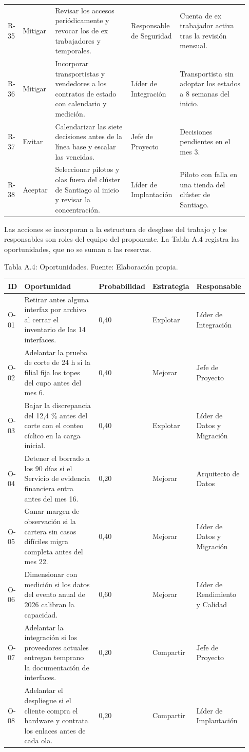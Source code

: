 \documentclass[11pt]{article}
\begin{document}
\begin{longtable}{p{0.065\linewidth}p{0.102\linewidth}p{0.316\linewidth}p{0.158\linewidth}p{0.288\linewidth}}
R-35 & Mitigar & Revisar los accesos periódicamente y revocar los de ex trabajadores y temporales. & Responsable de Seguridad & Cuenta de ex trabajador activa tras la revisión mensual. \\
R-36 & Mitigar & Incorporar transportistas y vendedores a los contratos de estado con calendario y medición. & Líder de Integración & Transportista sin adoptar los estados a 8 semanas del inicio. \\
R-37 & Evitar & Calendarizar las siete decisiones antes de la línea base y escalar las vencidas. & Jefe de Proyecto & Decisiones pendientes en el mes 3. \\
R-38 & Aceptar & Seleccionar pilotos y olas fuera del clúster de Santiago al inicio y revisar la concentración. & Líder de Implantación & Piloto con falla en una tienda del clúster de Santiago. \\
\end{longtable}

Las acciones se incorporan a la estructura de desglose del trabajo y los responsables son roles del equipo del proponente. La Tabla A.4 registra las oportunidades, que no se suman a las reservas.

Tabla A.4: Oportunidades. Fuente: Elaboración propia.

\begin{longtable}{p{0.074\linewidth}p{0.428\linewidth}p{0.112\linewidth}p{0.130\linewidth}p{0.186\linewidth}}
\toprule
\textbf{ID} & \textbf{Oportunidad} & \textbf{Probabilidad} & \textbf{Estrategia} & \textbf{Responsable} \\
\midrule
\endhead
\bottomrule
\endlastfoot
O-01 & Retirar antes alguna interfaz por archivo al cerrar el inventario de las 14 interfaces. & 0,40 & Explotar & Líder de Integración \\
O-02 & Adelantar la prueba de corte de 24 h si la filial fija los topes del cupo antes del mes 6. & 0,40 & Mejorar & Jefe de Proyecto \\
O-03 & Bajar la discrepancia del 12,4 \% antes del corte con el conteo cíclico en la carga inicial. & 0,40 & Explotar & Líder de Datos y Migración \\
O-04 & Detener el borrado a los 90 días si el Servicio de evidencia financiera entra antes del mes 16. & 0,20 & Mejorar & Arquitecto de Datos \\
O-05 & Ganar margen de observación si la cartera sin casos difíciles migra completa antes del mes 22. & 0,40 & Mejorar & Líder de Datos y Migración \\
O-06 & Dimensionar con medición si los datos del evento anual de 2026 calibran la capacidad. & 0,60 & Mejorar & Líder de Rendimiento y Calidad \\
O-07 & Adelantar la integración si los proveedores actuales entregan temprano la documentación de interfaces. & 0,20 & Compartir & Jefe de Proyecto \\
O-08 & Adelantar el despliegue si el cliente compra el hardware y contrata los enlaces antes de cada ola. & 0,20 & Compartir & Líder de Implantación \\
\end{longtable}
\end{document}
